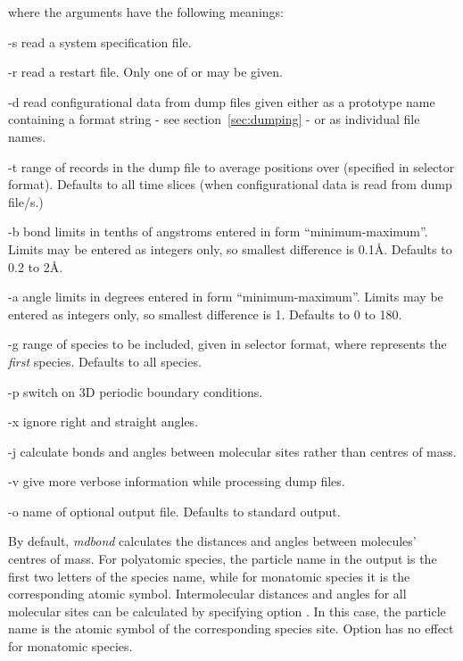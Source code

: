 \documentclass[a4paper,twoside]{report}
\begin{document}
where the arguments have the following meanings:
\begin{Argdescription}
\item[-s] read a system specification file.
\item[-r] read a restart file. Only one of  or  may be given.
\item[-d] read configurational data from dump files given either as a prototype name
containing a  format string - see section~\ref{sec:dumping} - or as individual file names.
\item[-t] range of records in the dump file to average positions over (specified in selector
  format). Defaults to all time slices (when configurational data is read from dump file/s.)
\item[-b] bond limits in tenths of angstroms entered in form
  ``minimum-maximum''. Limits may be entered as integers only, so
  smallest difference is 0.1{\AA}. Defaults to 0.2 to 2{\AA}.
\item[-a] angle limits in degrees entered in form ``minimum-maximum''.
  Limits may be entered as integers only, so smallest difference is
  1{\textdegree}. Defaults to 0 to 180{\textdegree}.
\item[-g] range of species to be included, given in selector format,
  where  represents the \emph{first} species. Defaults to all species.
\item[-p] switch on 3D periodic boundary conditions.
\item[-x] ignore right and straight angles.
\item[-j] calculate bonds and angles between molecular sites rather than centres of mass.
\item[-v] give more verbose information while processing dump files.
\item[-o] name of optional output file. Defaults to standard output.
\end{Argdescription}


By default, \emph{mdbond} calculates the distances and angles between molecules' centres of mass.
 For polyatomic species, the particle name in the output is the first two letters
 of the species name, while for monatomic species it is the corresponding atomic symbol. 
Intermolecular distances and angles for all molecular sites
 can be calculated by specifying option .
 In this case, the particle name is the atomic symbol
of the corresponding species site. Option  has no effect for monatomic species.
\end{document}
